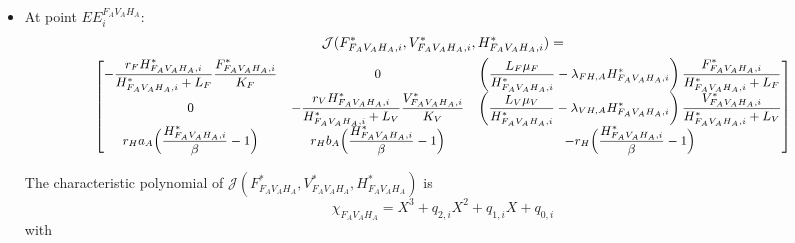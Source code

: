 \documentclass{article}
\newcommand{\lfa}{\lambda_{FH, A}}
\newcommand{\lva}{\lambda_{VH, A}}
\begin{document}
\begin{itemize}
\item At point $EE^{F_AV_AH_A}_i$:
\begin{multline*}
\mathcal{J}(F^*_{F_AV_AH_A, i}, V^*_{F_AV_AH_A, i}, H^*_{F_AV_AH_A, i}) = \\ \small{ \begin{bmatrix}
-\dfrac{r_F H^*_{F_AV_AH_A, i}}{H^*_{F_AV_AH_A, i} + L_F}\dfrac{F^*_{F_AV_AH_A, i}}{K_F} & 0 & \left(\dfrac{L_F\mu_F}{H^*_{F_AV_AH_A, i}} - \lfa H^*_{F_AV_AH_A, i}\right) \dfrac{F^*_{F_AV_AH_A, i}}{H^*_{F_AV_AH_A, i}+L_F} \\
0& -\dfrac{r_V H^*_{F_AV_AH_A, i}}{H^*_{F_AV_AH_A, i} + L_V}\dfrac{V^*_{F_AV_AH_A, i}}{K_V} & \left(\dfrac{L_V\mu_V}{H^*_{F_AV_AH_A, i}} - \lva H^*_{F_AV_AH_A, i} \right) \dfrac{V^*_{F_AV_AH_A, i}}{H^*_{F_AV_AH_A, i} + L_V} \\
 r_H a_A \Big(\dfrac{H^*_{F_AV_AH_A, i}}{\beta}-1\Big) & r_H b_A \Big(\dfrac{H^*_{F_AV_AH_A, i}}{\beta}-1\Big) & -r_H \Big(\dfrac{H^*_{F_AV_AH_A, i}}{\beta}-1\Big)
\end{bmatrix}}
\end{multline*}

The characteristic polynomial of $\mathcal{J}(F^*_{F_AV_AH_A}, V^*_{F_AV_AH_A}, H^*_{F_AV_AH_A})$ is 
\begin{equation}
\chi_{F_AV_AH_A} = X^3 + q_{2,i} X^2 + q_{1,i} X + q_{0,i}
\end{equation}
with


\end{itemize}
\end{document}
